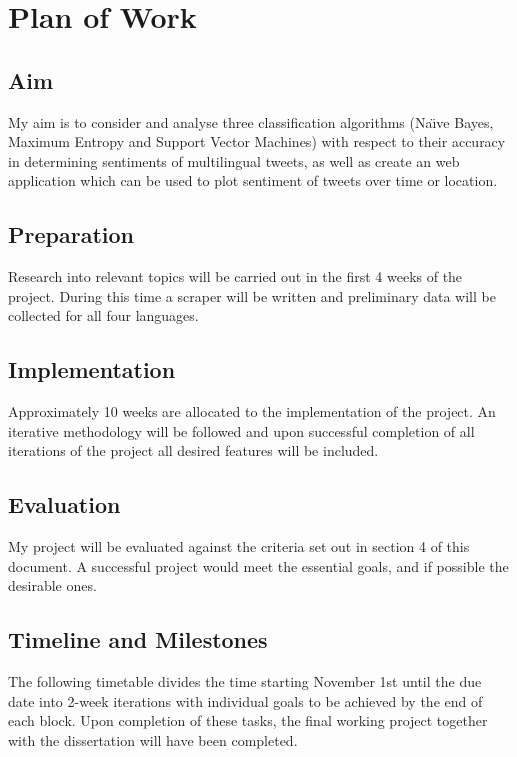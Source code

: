 \section{Plan of Work}

\subsection*{Aim}

My aim is to consider and analyse three classification algorithms (Na\"{\i}ve Bayes, Maximum Entropy and Support Vector Machines) with respect to their accuracy in determining sentiments of multilingual tweets, as well as create an web application which can be used to plot sentiment of tweets over time or location.

\subsection*{Preparation}

Research into relevant topics will be carried out in the first 4 weeks of the project. During this time a scraper will be written and preliminary data will be collected for all four languages.

\subsection*{Implementation}

Approximately 10 weeks are allocated to the implementation of the project. An iterative methodology will be followed and upon successful completion of all iterations of the project all desired features will be included.

\subsection*{Evaluation}

My project will be evaluated against the criteria set out in section 4 of this document. A successful project would meet the essential goals, and if possible the desirable ones.

\subsection*{Timeline and Milestones}

The following timetable divides the time starting November 1st until the due date into 2-week iterations with individual goals to be achieved by the end of each block. Upon completion of these tasks, the final working project together with the dissertation will have been completed.

